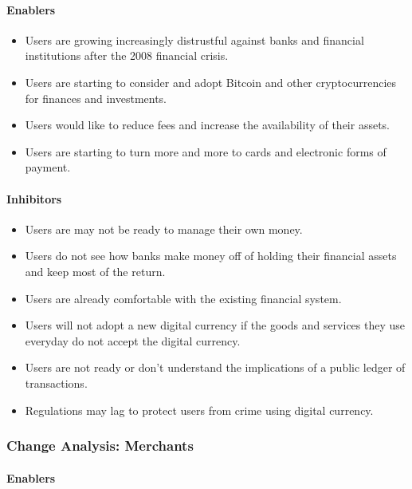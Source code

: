 \documentclass[a4paper,12pt]{article} %
\begin{document}
{\paragraph*{Enablers}

\begin{itemize}
	\item Users are growing increasingly distrustful against banks and financial institutions after the 2008 financial crisis.
	\item Users are starting to consider and adopt Bitcoin and other cryptocurrencies for finances and investments.
	\item Users would like to reduce fees and increase the availability of their assets.
	\item Users are starting to turn more and more to cards and electronic forms of payment.
\end{itemize}

\paragraph*{Inhibitors}

\begin{itemize}
	\item Users are may not be ready to manage their own money.
	\item Users do not see how banks make money off of holding their financial assets and keep most of the return.
	\item Users are already comfortable with the existing financial system.
	\item Users will not adopt a new digital currency if the goods and services they use everyday do not accept the digital currency.
	\item Users are not ready or don't understand the implications of a public ledger of transactions.
	\item Regulations may lag to protect users from crime using digital currency.
\end{itemize}

\subsubsection{Change Analysis: Merchants} \label{sssec:4.5:merchants}

\paragraph*{Enablers}

}
\end{document}
